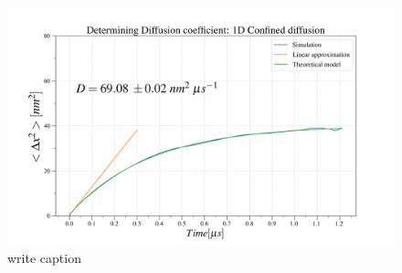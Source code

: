 \begin{figure}[ht!]
\begin{center}
  \includegraphics[width=\textwidth]{Figures/MR-100-diff.png}
  \caption[short lof/lot caption]{write caption}
\end{center}
\end{figure}
